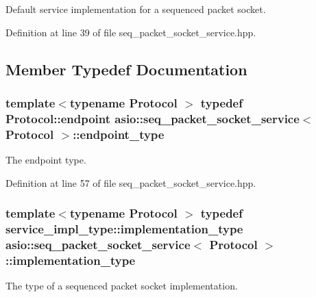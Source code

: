 Default service implementation for a sequenced packet socket. 

Definition at line 39 of file seq\+\_\+packet\+\_\+socket\+\_\+service.\+hpp.



\subsection{Member Typedef Documentation}
\hypertarget{classasio_1_1seq__packet__socket__service_ade8f7b83e2a45da7bbdc473deaf25075}{}
\subsubsection[{endpoint\+\_\+type}]{\setlength{\rightskip}{0pt plus 5cm}template$<$typename Protocol $>$ typedef Protocol\+::endpoint {\bf asio\+::seq\+\_\+packet\+\_\+socket\+\_\+service}$<$ Protocol $>$\+::{\bf endpoint\+\_\+type}}\label{classasio_1_1seq__packet__socket__service_ade8f7b83e2a45da7bbdc473deaf25075}


The endpoint type. 



Definition at line 57 of file seq\+\_\+packet\+\_\+socket\+\_\+service.\+hpp.

\hypertarget{classasio_1_1seq__packet__socket__service_a6e1d2027450d7a5d8ea7896a3de0c8ff}{}
\subsubsection[{implementation\+\_\+type}]{\setlength{\rightskip}{0pt plus 5cm}template$<$typename Protocol $>$ typedef {\bf service\+\_\+impl\+\_\+type\+::implementation\+\_\+type} {\bf asio\+::seq\+\_\+packet\+\_\+socket\+\_\+service}$<$ Protocol $>$\+::{\bf implementation\+\_\+type}}\label{classasio_1_1seq__packet__socket__service_a6e1d2027450d7a5d8ea7896a3de0c8ff}


The type of a sequenced packet socket implementation. 



